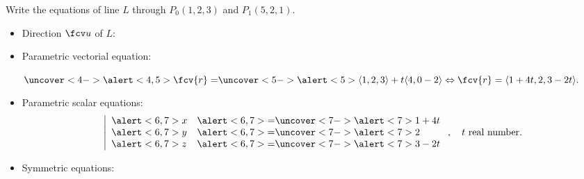 \begin{frame}
\begin{example}

Write the equations of line $L$ through $P_0(1,2,3)$ and $P_1(5,2,1)$.

\begin{itemize}
\item<2-> Direction $\fcv u$ of $L$: 
\item<4-> Parametric vectorial equation:

$  \uncover<4->{\alert<4,5>{\fcv{r}=}} \uncover<5->{
\alert<5>{ 
\langle 1,2,3\rangle + t \langle 4, 0 -2\rangle \Leftrightarrow  \fcv{r} = \langle 1+4t, 2, 3-2t\rangle
} .}
$
\item<6-> Parametric scalar equations:
\[\left|
\begin{array}{ll}
\alert<6,7>{x} & \alert<6,7>{=}\uncover<7->{\alert<7>{ 1+4t}} \\
\alert<6,7>{y} & \alert<6,7>{=}\uncover<7->{\alert<7>{ 2 }}\\
\alert<6,7>{z} & \alert<6,7>{=}\uncover<7->{\alert<7>{ 3-2t}}
\end{array}
\right. , \quad t \text{ real number.}\]
%
\item<8-> \alert<8>{Symmetric equations:}
\end{itemize}
\end{example}
\end{frame}